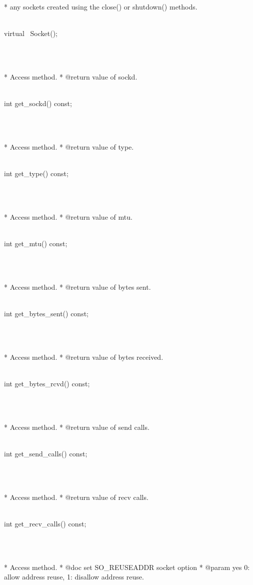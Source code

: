 \documentclass{article}
\begin{document}
{      * any sockets created using the close() or shutdown() methods.
	  \strut\goodbreak
{}\strut\nopagebreak\\
         virtual ~Socket();
\strut\\\strut\\* Access method.
	  * @return value of sockd.  
	  \strut\goodbreak
{}\strut\nopagebreak\\
         int get_sockd() const;
\strut\\\strut\\* Access method.
 	  * @return value of type.  
	  \strut\goodbreak
{}\strut\nopagebreak\\
         int get_type() const;
\strut\\\strut\\*  Access method.
	  * @return value of mtu.  
	  \strut\goodbreak
{}\strut\nopagebreak\\
         int get_mtu() const;
\strut\\\strut\\* Access method.
	  * @return value of bytes sent.  
	  \strut\goodbreak
{}\strut\nopagebreak\\
         int get_bytes_sent() const;
\strut\\\strut\\* Access method.
	  * @return value of bytes received.  
	  \strut\goodbreak
{}\strut\nopagebreak\\
         int get_bytes_rcvd() const;
\strut\\\strut\\* Access method.
	  * @return value of send calls.  
	  \strut\goodbreak
{}\strut\nopagebreak\\
         int get_send_calls() const;
\strut\\\strut\\* Access method.
	  * @return value of recv calls.  
	  \strut\goodbreak
{}\strut\nopagebreak\\
         int get_recv_calls() const;
\strut\\\strut\\* Access method.
	  * @doc set SO_REUSEADDR socket option
	  * @param yes 0: allow address reuse, 1: disallow address reuse.
}
\end{document}

